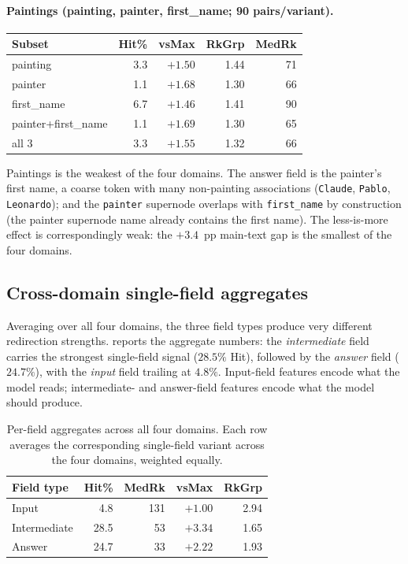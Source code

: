 \paragraph{Paintings (painting, painter, first\_name; 90 pairs/variant).}
\begin{center}\small
\begin{tabular}{lrrrr}
\toprule
Subset & Hit\% & vsMax & RkGrp & MedRk \\
\midrule
painting           & 3.3 & $+1.50$ & 1.44 & 71 \\
painter            & 1.1 & $+1.68$ & 1.30 & 66 \\
first\_name         & 6.7 & $+1.46$ & 1.41 & 90 \\
painter+first\_name & 1.1 & $+1.69$ & 1.30 & 65 \\
all 3              & 3.3 & $+1.55$ & 1.32 & 66 \\
\bottomrule
\end{tabular}
\end{center}

Paintings is the weakest of the four domains. The answer field is the painter's first name, a coarse token with many non-painting associations (\texttt{Claude}, \texttt{Pablo}, \texttt{Leonardo}); and the \texttt{painter} supernode overlaps with \texttt{first\_name} by construction (the painter supernode name already contains the first name). The less-is-more effect is correspondingly weak: the $+3.4$~pp main-text gap is the smallest of the four domains.

\subsection{Cross-domain single-field aggregates}

Averaging over all four domains, the three field types produce very different redirection strengths.  reports the aggregate numbers: the \emph{intermediate} field carries the strongest single-field signal ($28.5\%$ Hit), followed by the \emph{answer} field ($24.7\%$), with the \emph{input} field trailing at $4.8\%$. Input-field features encode what the model reads; intermediate- and answer-field features encode what the model should produce.

\begin{table}[h]
\centering\small
\begin{tabular}{lrrrr}
\toprule
Field type   & Hit\% & MedRk & vsMax & RkGrp \\
\midrule
Input        &  4.8 & 131 & $+1.00$ & 2.94 \\
Intermediate & 28.5 &  53 & $+3.34$ & 1.65 \\
Answer       & 24.7 &  33 & $+2.22$ & 1.93 \\
\bottomrule
\end{tabular}
\caption{Per-field aggregates across all four domains. Each row averages the corresponding single-field variant across the four domains, weighted equally.}
\label{tab:field-aggregate}
\end{table}

